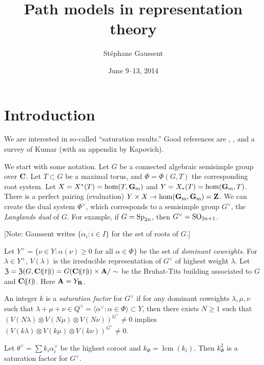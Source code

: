 \documentclass{article}
\title{Path models in representation theory}
\author{St\'ephane Gaussent}
\date{June 9--13, 2014}
\begin{document}
\maketitle
\tableofcontents





\section{Introduction}

We are interested in so-called ``saturation results.'' Good references are 
\cite{km08}, \cite{bcgr13}, and a survey of Kumar (with an appendix by 
Kapovich). 

We start with some notation. Let $G$ be a connected algebraic semisimple group 
over $\mathbf{C}$. Let $T\subset G$ be a maximal torus, and $\Phi=\Phi(G,T)$ the 
corresponding root system. Let $X=X^\ast(T)=\hom(T,\mathbf{G}_{\mathrm{m}})$ and 
$Y=X_\ast(T)=\hom(\mathbf{G}_{\mathrm{m}},T)$. There is a perfect pairing (evaluation) 
$Y\times X \to \hom(\mathbf{G}_{\mathrm{m}},\mathbf{G}_{\mathrm{m}}) = \mathbf{Z}$. We can create the dual 
system $\Phi^\vee$, which corresponds to a semisimple group $G^\vee$, the 
\emph{Langlands dual} of $G$. For example, if 
$G=\operatorname{Sp}_{2n}$, then $G^\vee=\operatorname{SO}_{2n+1}$. 

[Note: Gaussent writes $\{\alpha_i:i\in I\}$ for the set of roots of $G$.]

Let $Y^+ = \{\nu\in Y:\alpha(\nu)\geqslant 0\text{ for all }\alpha\in \Phi\}$ 
be the set of \emph{dominant coweights}. For $\lambda\in Y^+$, $V(\lambda)$ is 
the irreducible representation of $G^\vee$ of highest weight $\lambda$. Let 
$\mathfrak{Z}=\mathfrak{Z}(G,\mathbf{C}(\! ( t )\! )) = G(\mathbf{C}(\! ( t )\! ))\times \mathbf{A}/\sim$ be the Bruhat-Tits 
building associated to $G$ and $\mathbf{C}(\! ( t )\! )$. Here $\mathbf{A}=Y_{\mathbf{R}}$. 

An integer $k$ is a \emph{saturation factor} for $G^\vee$ if for any 
dominant coweights $\lambda,\mu,\nu$ such that 
$\lambda+\mu+\nu\in Q^\vee = \langle \alpha^\vee:\alpha\in \Phi\rangle\subset Y$, 
then there exists $N\geqslant 1$ such that 
$(V(N\lambda)\otimes V(N\mu)\otimes V(N\nu))^{G^\vee}\ne 0$ implies 
$(V(k\lambda)\otimes V(k\mu)\otimes V(k\nu))^{G^\vee}\ne 0$. 

\begin{theorem}
Let $\theta^\vee=\sum k_i \alpha_i^\vee$ be the highest coroot and 
$k_\Phi=\operatorname{lcm}(k_i)$. Then $k_\Phi^2$ is a saturation factor for 
$G^\vee$. 
\end{theorem}
\end{document}
